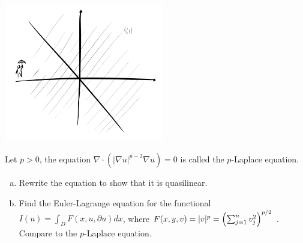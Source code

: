 \documentclass{article}
\newcommand{\D}{\nabla}
\renewcommand{\d}{\partial}
\begin{document}
\begin{center}
    \includegraphics[height=6cm]{../images/rain}
\end{center}

\newpage
{} Let $p > 0$, the equation $\D \cdot (|\D u|^{p-2}\D u) = 0$ is called the $p$-Laplace equation.
\begin{enumerate}[(a)]
    \item Rewrite the equation to show that it is quasilinear.
    \item Find the Euler-Lagrange equation for the functional $I(u) = \int_D F (x, u, \d u)dx$, where
    $F (x, y, v) = |v|^p =
    \del{\sum^n
    _{j=1} v^2_j
    }^{p/2}$
    . Compare to the $p$-Laplace equation.
\end{enumerate}\tri
\hop
\solution
\end{document}
